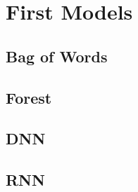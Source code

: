 \section{First Models}
\label{sec:first_models}

  \subsection{Bag of Words}
  \label{sec:bag_of_words}

  \subsection{Forest}
  \label{sec:forest}

  \subsection{DNN}
  \label{sec:dnn}

  \subsection{RNN}
  \label{sec:rnn}